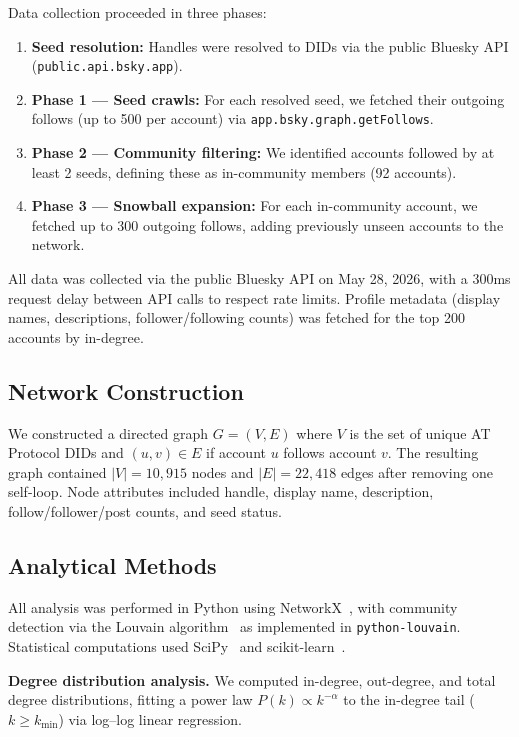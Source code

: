 \documentclass[11pt,a4paper]{article}
\begin{document}
Data collection proceeded in three phases:
\begin{enumerate}[leftmargin=*]
    \item \textbf{Seed resolution:} Handles were resolved to DIDs via the public Bluesky API (\texttt{public.api.bsky.app}).
    \item \textbf{Phase 1 --- Seed crawls:} For each resolved seed, we fetched their outgoing follows (up to 500 per account) via \texttt{app.bsky.graph.getFollows}.
    \item \textbf{Phase 2 --- Community filtering:} We identified accounts followed by at least 2 seeds, defining these as in-community members (92 accounts).
    \item \textbf{Phase 3 --- Snowball expansion:} For each in-community account, we fetched up to 300 outgoing follows, adding previously unseen accounts to the network.
\end{enumerate}

All data was collected via the public Bluesky API on May 28, 2026, with a 300ms request delay between API calls to respect rate limits. Profile metadata (display names, descriptions, follower/following counts) was fetched for the top 200 accounts by in-degree.

\subsection{Network Construction}

We constructed a directed graph $G = (V, E)$ where $V$ is the set of unique AT Protocol DIDs and $(u, v) \in E$ if account $u$ follows account $v$. The resulting graph contained $|V| = 10{,}915$ nodes and $|E| = 22{,}418$ edges after removing one self-loop. Node attributes included handle, display name, description, follow/follower/post counts, and seed status.

\subsection{Analytical Methods}

All analysis was performed in Python using NetworkX~\cite{networkx}, with community detection via the Louvain algorithm~\cite{louvain} as implemented in \texttt{python-louvain}. Statistical computations used SciPy~\cite{scipy} and scikit-learn~\cite{scikit-learn}.

\textbf{Degree distribution analysis.} We computed in-degree, out-degree, and total degree distributions, fitting a power law $P(k) \propto k^{-\alpha}$ to the in-degree tail ($k \geq k_{\min}$) via log--log linear regression.
\end{document}
